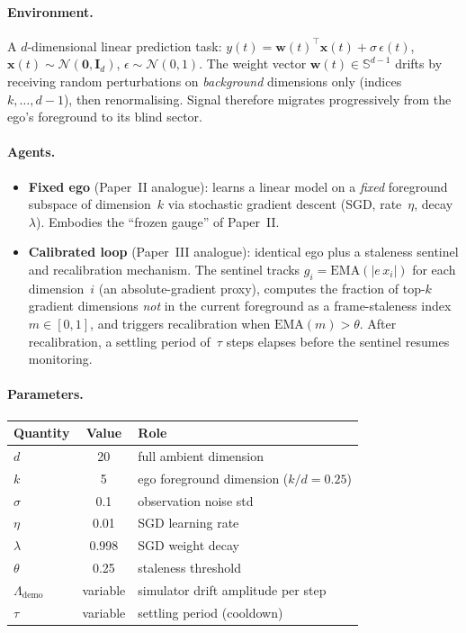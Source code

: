 \documentclass[12pt]{article}
\begin{document}
\paragraph{Environment.}
A $d$-dimensional linear prediction task:
$y(t) = \mathbf{w}(t)^\top \mathbf{x}(t)
+ \sigma\,\epsilon(t)$,
$\mathbf{x}(t) \sim \mathcal{N}(\mathbf{0}, \mathbf{I}_d)$,
$\epsilon \sim \mathcal{N}(0,1)$.
The weight vector $\mathbf{w}(t) \in \mathbb{S}^{d-1}$
drifts by receiving random perturbations on
\emph{background} dimensions only (indices $k,\ldots,d{-}1$),
then renormalising.  Signal therefore migrates progressively
from the ego's foreground to its blind sector.

\paragraph{Agents.}
\begin{itemize}
\item \textbf{Fixed ego} (Paper~II analogue):
  learns a linear model on a \emph{fixed} foreground
  subspace of dimension~$k$ via stochastic gradient descent
  (SGD, rate~$\eta$, decay~$\lambda$).
  Embodies the ``frozen gauge'' of Paper~II.
\item \textbf{Calibrated loop} (Paper~III analogue):
  identical ego plus a staleness sentinel and recalibration
  mechanism.
  The sentinel tracks $g_i = \mathrm{EMA}(|e\,x_i|)$ for
  each dimension~$i$ (an absolute-gradient proxy),
  computes the fraction of top-$k$ gradient dimensions
  \emph{not} in the current foreground as a frame-staleness
  index $m \in [0,1]$, and triggers
  recalibration when
  $\mathrm{EMA}(m) > \theta$.
  After recalibration, a settling period
  of~$\tau$ steps elapses before the sentinel resumes
  monitoring.
\end{itemize}

\paragraph{Parameters.}
\begin{center}
\small
\begin{tabular}{@{}lcl@{}}
\toprule
\textbf{Quantity} & \textbf{Value} & \textbf{Role} \\
\midrule
$d$ & 20 & full ambient dimension \\
$k$ & 5  & ego foreground dimension ($k/d = 0.25$) \\
$\sigma$ & 0.1 & observation noise std \\
$\eta$ & 0.01 & SGD learning rate \\
$\lambda$ & 0.998 & SGD weight decay \\
$\theta$ & 0.25 & staleness threshold \\
$\Lambda_{\mathrm{demo}}$ & variable & simulator drift amplitude per step \\
$\tau$ & variable & settling period (cooldown) \\
\bottomrule
\end{tabular}
\end{center}
\end{document}
